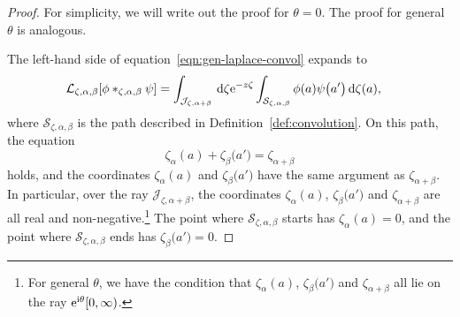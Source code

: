 \documentclass[10pt,a4paper]{amsart}
\newcommand{\laplace}{\mathcal{L}}
\numberwithin{equation}{section}
\begin{document}
\begin{proof}
For simplicity, we will write out the proof for $\theta = 0$. The proof for general $\theta$ is analogous.

The left-hand side of equation~\eqref{eqn:gen-laplace-convol} expands to
\begin{align*}
\laplace_{\zeta,\alpha,\beta}[\phi \ast_{\zeta,\alpha, \beta} \psi] &= \int_{\mathcal{J}_{\zeta, \alpha+\beta}} \,{\rm d}\zeta {\rm e}^{-z\zeta}\int_{\mathcal{S}_{\zeta,\alpha,\beta}} \phi(a) \psi\bigl(a'\bigr) \,{\rm d}\zeta(a),
\end{align*}
where $\mathcal{S}_{\zeta, \alpha, \beta}$ is the path described in Definition~\ref{def:convolution}. On this path, the equation
\begin{equation}\label{eq:slice-plane}
\zeta_\alpha(a) + \zeta_\beta\bigl(a'\bigr) = \zeta_{\alpha+\beta}
\end{equation}
holds, and the coordinates $\zeta_\alpha(a)$ and $\zeta_\beta\bigl(a'\bigr)$ have the same argument as $\zeta_{\alpha+\beta}$. In particular, over the ray $\mathcal{J}_{\zeta, \alpha+\beta}$, the coordinates $\zeta_\alpha(a)$, $\zeta_\beta\bigl(a'\bigr)$ and $\zeta_{\alpha+\beta}$ are all real and non-negative.\footnote{For general $\theta$, we have the condition that $\zeta_\alpha(a)$, $\zeta_\beta\bigl(a'\bigr)$ and $\zeta_{\alpha+\beta}$ all lie on the ray ${\rm e}^{{\rm i}\theta}[0, \infty)$.} The point where $\mathcal{S}_{\zeta, \alpha, \beta}$ starts has $\zeta_\alpha(a) = 0$, and the point where $\mathcal{S}_{\zeta, \alpha, \beta}$ ends has $\zeta_\beta\bigl(a'\bigr) = 0$.


\end{proof}
\end{document}
